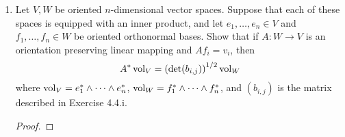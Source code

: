 \documentclass[../psets.tex]{subfiles}
\begin{document}
\begin{enumerate}[label={\textbf{4.4.\roman*.}}]
\begin{proof}
        To prove that $\mathbf{B}=\mathbf{A}^\intercal\mathbf{A}$, it will suffice to show that the corresponding entries of each matrix are equal. By the rules of matrix multiplication, we have that
        \begin{equation*}
            (a^\intercal a)_{i,j} = \sum_{k=1}^na_{k,i}a_{k,j}
        \end{equation*}
        It follows that
        \begin{align*}
            b_{i,j} &= B(v_i,v_j)\\
            &= B\left( \sum_{k=1}^na_{k,i}e_k,\sum_{k'=1}^na_{k',j}e_{k'} \right)\\
            &= \sum_{k=1}^n\sum_{k'=1}^na_{k,i}a_{k',j}B(e_k,e_{k'})\\
            &= \sum_{k=1}^n\sum_{k'=1}^na_{k,i}a_{k',j}\delta_{k,k'}\\
            &= \sum_{k=1}^na_{k,i}a_{k,j}\\
            &= (a^\intercal a)_{i,j}
        \end{align*}
        as desired.\par
        It follows that
        \begin{equation*}
            \det(\mathbf{B}) = \det(\mathbf{A}^\intercal\mathbf{A})
            = \det(\mathbf{A}^\intercal)\det(\mathbf{A})
            = \det(\mathbf{A})\det(\mathbf{A})
            = \det(\mathbf{A})^2
        \end{equation*}
        Therefore, if $v_1,\dots,v_n$ are linearly independent, then $\det(\mathbf{A})\neq 0$, so $\det(\mathbf{B})>0$, as desired.
    \end{proof}
    \item Let $V,W$ be oriented $n$-dimensional vector spaces. Suppose that each of these spaces is equipped with an inner product, and let $e_1,\dots,e_n\in V$ and $f_1,\dots,f_n\in W$ be oriented orthonormal bases. Show that if $A:W\to V$ is an orientation preserving linear mapping and $Af_i=v_i$, then
    \begin{equation*}
        A^*\operatorname{vol}_V = \left( \det(b_{i,j}) \right)^{1/2}\operatorname{vol}_W
    \end{equation*}
    where $\operatorname{vol}_V=e_1^*\wedge\cdots\wedge e_n^*$, $\operatorname{vol}_W=f_1^*\wedge\cdots\wedge f_n^*$, and $(b_{i,j})$ is the matrix described in Exercise 4.4.i.
    \begin{proof}



\end{proof}
\end{enumerate}
\end{document}
